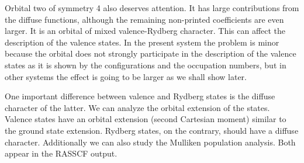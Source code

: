 
Orbital two of symmetry 4 also deserves attention. It has large
contributions from the diffuse functions, although the remaining non-printed
coefficients are even larger. It is an orbital of mixed 
valence-Rydberg character. This can affect the description of the valence
states. In the present system the problem is minor because the orbital
does not strongly participate in the description of the valence states
as it is shown by the configurations and the occupation numbers, but
in other systems the effect is going to be larger as we shall show later.

One important difference between valence and Rydberg states is the diffuse
character of the latter. We can analyze the orbital extension of the states.
Valence states have an orbital extension (second Cartesian moment)
similar to the ground state extension. Rydberg states, on the contrary,
should have a diffuse character. Additionally we can also study the
Mulliken population analysis. Both appear in the RASSCF output.


